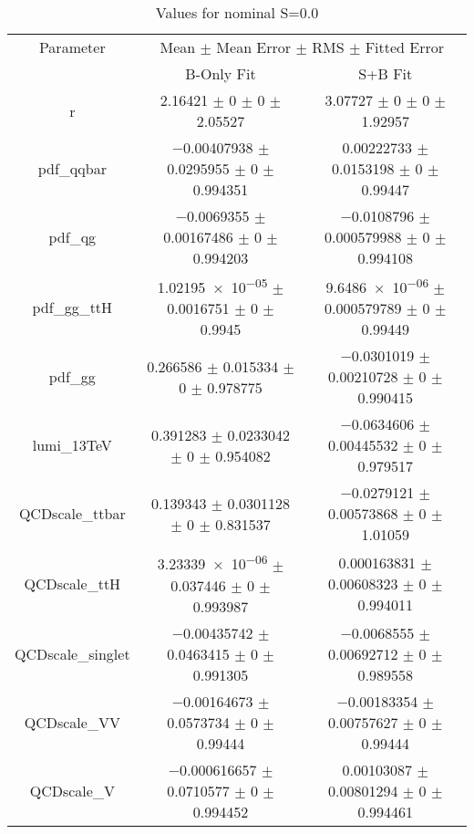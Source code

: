 \begin{table}
\centering
\caption{Values for nominal S=0.0}
\begin{tabular}{ccc}
\toprule
Parameter & \multicolumn{2}{c}{Mean $\pm$ Mean Error $\pm$ RMS $\pm$ Fitted Error}\\
 & B-Only Fit & S+B Fit\\
\midrule
r & \num{2.16421} $\pm$ \num{0} $\pm$ \num{0} $\pm$ \num{2.05527} & \num{3.07727} $\pm$ \num{0} $\pm$ \num{0} $\pm$ \num{1.92957}\\
pdf\_qqbar & \num{-0.00407938} $\pm$ \num{0.0295955} $\pm$ \num{0} $\pm$ \num{0.994351} & \num{0.00222733} $\pm$ \num{0.0153198} $\pm$ \num{0} $\pm$ \num{0.99447}\\
pdf\_qg & \num{-0.0069355} $\pm$ \num{0.00167486} $\pm$ \num{0} $\pm$ \num{0.994203} & \num{-0.0108796} $\pm$ \num{0.000579988} $\pm$ \num{0} $\pm$ \num{0.994108}\\
pdf\_gg\_ttH & \num{1.02195e-05} $\pm$ \num{0.0016751} $\pm$ \num{0} $\pm$ \num{0.9945} & \num{9.6486e-06} $\pm$ \num{0.000579789} $\pm$ \num{0} $\pm$ \num{0.99449}\\
pdf\_gg & \num{0.266586} $\pm$ \num{0.015334} $\pm$ \num{0} $\pm$ \num{0.978775} & \num{-0.0301019} $\pm$ \num{0.00210728} $\pm$ \num{0} $\pm$ \num{0.990415}\\
lumi\_13TeV & \num{0.391283} $\pm$ \num{0.0233042} $\pm$ \num{0} $\pm$ \num{0.954082} & \num{-0.0634606} $\pm$ \num{0.00445532} $\pm$ \num{0} $\pm$ \num{0.979517}\\
QCDscale\_ttbar & \num{0.139343} $\pm$ \num{0.0301128} $\pm$ \num{0} $\pm$ \num{0.831537} & \num{-0.0279121} $\pm$ \num{0.00573868} $\pm$ \num{0} $\pm$ \num{1.01059}\\
QCDscale\_ttH & \num{3.23339e-06} $\pm$ \num{0.037446} $\pm$ \num{0} $\pm$ \num{0.993987} & \num{0.000163831} $\pm$ \num{0.00608323} $\pm$ \num{0} $\pm$ \num{0.994011}\\
QCDscale\_singlet & \num{-0.00435742} $\pm$ \num{0.0463415} $\pm$ \num{0} $\pm$ \num{0.991305} & \num{-0.0068555} $\pm$ \num{0.00692712} $\pm$ \num{0} $\pm$ \num{0.989558}\\
QCDscale\_VV & \num{-0.00164673} $\pm$ \num{0.0573734} $\pm$ \num{0} $\pm$ \num{0.99444} & \num{-0.00183354} $\pm$ \num{0.00757627} $\pm$ \num{0} $\pm$ \num{0.99444}\\
QCDscale\_V & \num{-0.000616657} $\pm$ \num{0.0710577} $\pm$ \num{0} $\pm$ \num{0.994452} & \num{0.00103087} $\pm$ \num{0.00801294} $\pm$ \num{0} $\pm$ \num{0.994461}\\

\end{tabular}
\end{table}
